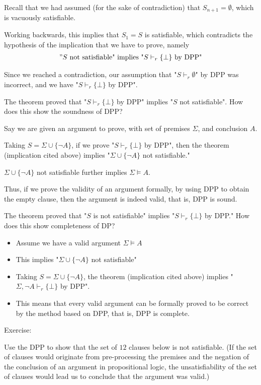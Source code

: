 \documentclass{article}
\begin{document}
Recall that we had assumed (for the sake of contradiction) that $S_{n+1} = \emptyset$, which is vacuously satisfiable. 

Working backwards, this implies that $S_1 = S$ is satisfiable, which contradicts the hypothesis of the implication that we have to prove, namely
\begin{align*}
"S \text{ not satisfiable" implies "} S \vdash_r \{\bot\} \text{ by DPP"}
\end{align*}

Since we reached a contradiction, our assumption that "$S \vdash_r \emptyset$" by DPP was incorrect, and we have "$S \vdash_r \{\bot\}$ by DPP".

The theorem proved that "$S \vdash_r \{\bot\}$ by DPP" implies "$S$ not satisfiable". How does this show the soundness of DPP? 

Say we are given an argument to prove, with set of premises $\Sigma$, and conclusion $A$.

Taking $S = \Sigma \cup \{\neg A\}$, if we prove "$S \vdash_r \{\bot\}$ by DPP", then the theorem (implication cited above) implies "$\Sigma \cup \{\neg A\}$ not satisfiable."

$\Sigma \cup \{\neg A\}$ not satisfiable further implies $\Sigma \vDash A$.

Thus, if we prove the validity of an argument formally, by using DPP to obtain the empty clause, then the argument is indeed valid, that is, DPP is sound.

The theorem proved that "$S$ is not satisfiable" implies "$S \vdash_r \{\bot\}$ by DPP." How does this show completeness of DP?

\begin{itemize}
    \item Assume we have a valid argument $\Sigma \vDash A$
    \item This implies "$\Sigma \cup \{\neg A\}$ not satisfiable"
    \item Taking $S = \Sigma \cup \{\neg A\}$, the theorem (implication cited above) implies "$\Sigma, \neg A \vdash_r \{\bot\}$ by DPP". 
    \item This means that every valid argument can be formally proved to be correct by the method based on DPP, that is, DPP is complete.
\end{itemize}

Exercise:

Use the DPP to show that the set of $12$ clauses below is not satisfiable. (If the set of clauses would originate from pre-processing the premises and the negation of the conclusion of an argument in propositional logic, the unsatisfiability of the set of clauses would lead us to conclude that the argument was valid.)
\end{document}
